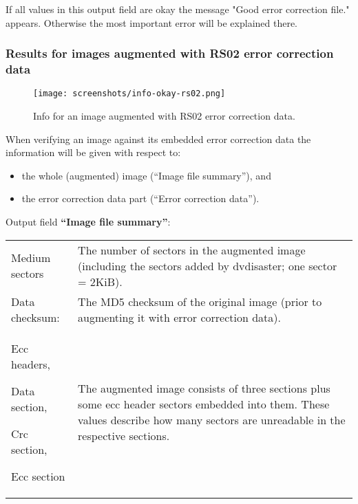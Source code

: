 \medskip

If all values in this output field are okay the 
message "\textcolor{dkgreen}{Good error correction file.}" appears. Otherwise 
the most important error will be explained there. 

\newpage
 	
\subsubsection{Results for images augmented with RS02 error correction data}
\label{howto-info-rs02}

\begin{figure}[h]
\centerline{\texttt{[image: screenshots/info-okay-rs02.png]}}
\caption{Info for an image augmented with RS02 error correction data.}
\label{howto-info-good-rs02}
\end{figure}

When verifying an image against its embedded error correction data the 
information will be given with respect to:

\begin{itemize}
\item the whole (augmented) image (``Image file summary''), and
\item the error correction data part (``Error correction data'').
\end{itemize}

\bigskip

Output field {\bf ``Image file summary''}:

\medskip

\begin{tabular}{p{28mm}p{125mm}}
  Medium sectors  & 
  The number of sectors in the augmented image (including the sectors added by dvdisaster; 
  one sector = 2KiB). \\
  Data checksum: &
  The MD5 checksum of the original image (prior to augmenting it with error correction data). \\
  Ecc headers, \par
  Data section,\par
  Crc section, \par
  Ecc section  & 
  The augmented image consists of three sections plus some ecc header sectors 
  embedded into them. These values describe how many sectors are unreadable 
  in the respective sections. \\
\end{tabular}

\medskip

